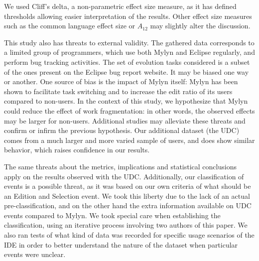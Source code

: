 \documentclass[times]{smrauth}
\begin{document}
We used Cliff's delta, a non-parametric effect size measure, as it has defined thresholds allowing easier interpretation of the results. Other effect size measures such as the common language effect size \cite{KMW92} or $A_{12}$ \cite{RRT12} may slightly alter the discussion.


This study also has threats to external validity. The gathered data corresponds to a limited group of programmers, which use both Mylyn and Eclipse regularly, and perform bug tracking activities. The set of evolution tasks considered is a subset of the ones present on the Eclipse bug report website. It may be biased one way or another. One source of bias is the impact of Mylyn itself: Mylyn has been shown to facilitate task switching and to increase the edit ratio of its users compared to non-users. In the context of this study, we hypothesize that Mylyn could reduce the effect of work fragmentation: in other words, the observed effects may be larger for non-users. Additional studies may alleviate these threats and confirm or infirm the previous hypothesis. Our additional dataset (the UDC) comes from a much larger and more varied sample of users, and does show similar behavior, which raises confidence in our results.



The same threats about the metrics, implications and statistical conclusions apply on the results observed with the UDC.  Additionally, our classification of events is a possible threat, as it was based on our own criteria of what should be an Edition and Selection event. We took this liberty due to the lack of an actual pre-classification, and on the other hand the extra information available on UDC events compared to Mylyn. We took special care when establishing the classification, using an iterative process involving two authors of this paper. We also ran tests of what kind of data was recorded for specific usage scenarios of the IDE in order to better understand the nature of the dataset when particular events were unclear.  %
\end{document}
